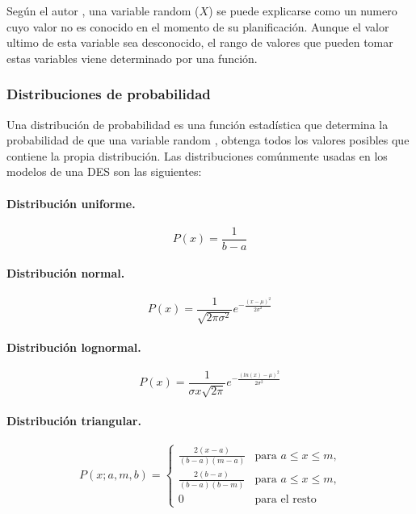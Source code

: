 Según el autor \citep{meester2008natural},
una variable random ($X$) se puede explicarse
como un numero cuyo valor no es conocido en el momento de su planificación.
Aunque el valor ultimo de esta variable sea desconocido,
el rango de valores que pueden tomar estas variables viene determinado por una función.
\subsubsection{Distribuciones de probabilidad}\label{sec_prob_dist}

Una distribución de probabilidad es una función estadística
que determina la probabilidad de que una variable random
\citep{simon2002probability},
obtenga todos los valores posibles que contiene la propia distribución.
Las distribuciones comúnmente usadas
en los modelos de una DES son las siguientes:

\paragraph{Distribución uniforme.}
\begin{equation}
	P(x) = \frac{1}{b-a}
\end{equation}

\paragraph{Distribución normal.}
\begin{equation}
	P(x) = \frac{1}{\sqrt{2 \pi \sigma ^{2}}} e^{-\frac{(x-\mu)^{2}}{2\sigma ^{2}}}
\end{equation}

\paragraph{Distribución lognormal.}
\begin{equation}
	P(x) = \frac{1}{\sigma x \sqrt{2 \pi}} e^{-\frac{(ln(x)-\mu)^{2}}{2\sigma ^{2}}}
\end{equation}

\paragraph{Distribución triangular.}
\begin{equation}
	P(x;a,m,b) =
	\begin{cases}
		\frac{2(x-a)}{(b-a)(m-a)}	&\text{para $a\leq x\leq m$,} \\
		\frac{2(b-x)}{(b-a)(b-m)}	&\text{para $a\leq x\leq m$,} \\
		0							&\text{para el resto}
	\end{cases}
\end{equation}

